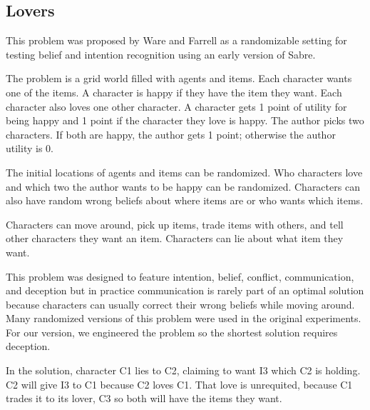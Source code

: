\documentclass{nilreport}
\makeatletter
\renewcommand{\bibentry}[1]{\nocite{#1}{\frenchspacing\@nameuse{BR@r@#1\@extra@b@citeb}}}
\makeatother
\begin{document}
\subsection{Lovers}

This problem was proposed by Ware and Farrell as a randomizable setting
for testing belief and intention recognition using an early version
of Sabre.

\begin{quote}
	\bibentry{farrell2020narrative}
\end{quote}

\noindent The problem is a grid world filled with agents and items.
Each character wants one of the items. A character is happy if they
have the item they want. Each character also loves one other character.
A character gets 1 point of utility for being happy and 1 point if
the character they love is happy. The author picks two characters.
If both are happy, the author gets 1 point; otherwise the author utility
is 0.

The initial locations of agents and items can be randomized. Who characters
love and which two the author wants to be happy can be randomized.
Characters can also have random wrong beliefs about where items are
or who wants which items.

Characters can move around, pick up items, trade items with others,
and tell other characters they want an item. Characters can lie about
what item they want.

This problem was designed to feature intention, belief, conflict,
communication, and deception but in practice communication is rarely
part of an optimal solution because characters can usually correct
their wrong beliefs while moving around. Many randomized versions
of this problem were used in the original experiments. For our version,
we engineered the problem so the shortest solution requires deception.

In the solution, character C1 lies to C2, claiming to want I3 which
C2 is holding. C2 will give I3 to C1 because C2 loves C1. That love
is unrequited, because C1 trades it to its lover, C3 so both will
have the items they want.

\medskip{}
\noindent{}
\end{document}
